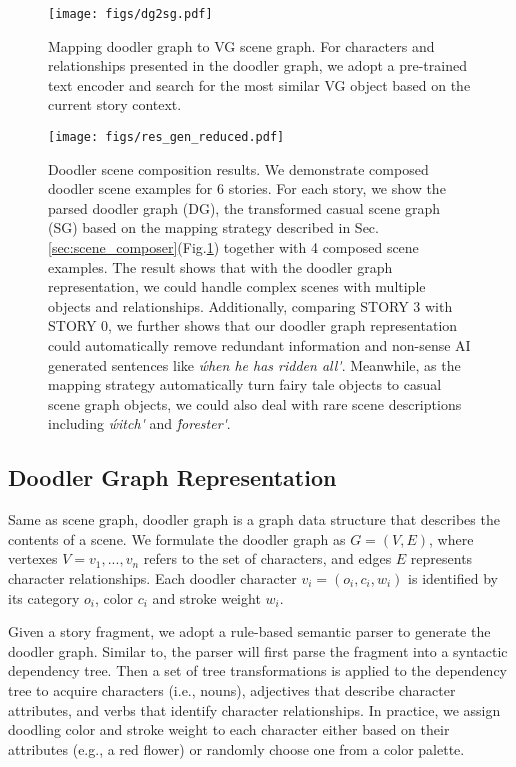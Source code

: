 \begin{figure}[t]
\begin{center}
   \texttt{[image: figs/dg2sg.pdf]}
\end{center}
\caption{Mapping doodler graph to VG scene graph. For characters and relationships presented in the doodler graph, we adopt a pre-trained text encoder\cite{Radford2021LearningTV} and search for the most similar VG\cite{Johnson} object based on the current story context.}
\label{fig:dg2sg}
\end{figure}

\begin{figure*}[!htb]
\begin{center}
   \texttt{[image: figs/res\_gen\_reduced.pdf]}
\end{center}
\caption{Doodler scene composition results. We demonstrate composed doodler scene examples for 6 stories. For each story, we show the parsed doodler graph (DG), the transformed casual scene graph (SG) based on the mapping strategy described in Sec. \ref{sec:scene_composer}(Fig.\ref{fig:dg2sg}) together with 4 composed scene examples. The result shows that with the doodler graph representation, we could handle complex scenes with multiple objects and relationships. Additionally, comparing STORY 3 with STORY 0, we further shows that our doodler graph representation could automatically remove redundant information and non-sense AI generated sentences like \textit{\'when he has ridden all\'}. Meanwhile, as the mapping strategy automatically turn fairy tale objects to casual scene graph objects, we could also deal with rare scene descriptions including \textit{\'witch\'} and \textit{\'forester\'}.}
\label{fig:res_gen}
\end{figure*}

\subsection{Doodler Graph Representation}
Same as scene graph, doodler graph is a graph data structure that describes the contents of a scene\cite{Johnson,Johnson2018,Johnson2018ImageGF}. We formulate the doodler graph as $G=(V,E)$, where vertexes $V={v_1,...,v_n }$ refers to the set of characters, and edges $E$ represents character relationships. Each doodler character $v_i=(o_i,c_i,w_i)$ is identified by its category $o_i$, color $c_i$ and stroke weight $w_i$. 

Given a story fragment, we adopt a rule-based semantic parser to generate the doodler graph. Similar to\cite{Johnson2018,Wu,Schuster}, the parser will first parse the fragment into a syntactic dependency tree. Then a set of tree transformations is applied to the dependency tree to acquire characters (i.e., nouns), adjectives that describe character attributes, and verbs that identify character relationships. In practice, we assign doodling color and stroke weight to each character either based on their attributes (e.g., a red flower) or randomly choose one from a color palette.



